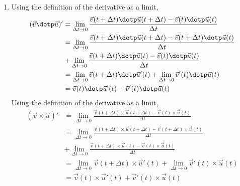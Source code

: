 \begin{enumerate}
    \item Using the definition of the derivative as a limit,
          \begin{align}
              (\vec{v} \dotp \vec{u})' & = \lim_{\Delta t \to 0}
              \frac{\vec{v}(t + \Delta t) \dotp \vec{u}(t + \Delta t) -
              \vec{v}(t) \dotp \vec{u}(t)}{\Delta t}             \\
                                       & = \lim_{\Delta t \to 0}
              \frac{\vec{v}(t + \Delta t) \dotp \vec{u}(t + \Delta t) -
              \vec{v}(t + \Delta t) \dotp \vec{u}(t)}{\Delta t}  \\
                                       & + \lim_{\Delta t \to 0}
              \frac{\vec{v}(t + \Delta t) \dotp \vec{u}(t) -
              \vec{v}(t) \dotp \vec{u}(t)}{\Delta t}             \\
                                       & = \lim_{\Delta t \to 0}
              \vec{v}(t + \Delta t) \dotp \vec{u}'(t) +
              \lim_{\Delta t \to 0} \vec{v}'(t) \dotp \vec{u}(t) \\
                                       & =
              \vec{v}(t) \dotp \vec{u}'(t) + \vec{v}'(t) \dotp \vec{u}(t)
          \end{align}
          Using the definition of the derivative as a limit,
          \begin{align}
              (\vec{v} \times \vec{u})' & = \lim_{\Delta t \to 0}
              \frac{\vec{v}(t + \Delta t) \times \vec{u}(t + \Delta t) -
              \vec{v}(t) \times \vec{u}(t)}{\Delta t}             \\
                                        & = \lim_{\Delta t \to 0}
              \frac{\vec{v}(t + \Delta t) \times \vec{u}(t + \Delta t) -
              \vec{v}(t + \Delta t) \times \vec{u}(t)}{\Delta t}  \\
                                        & + \lim_{\Delta t \to 0}
              \frac{\vec{v}(t + \Delta t) \times \vec{u}(t) -
              \vec{v}(t) \times \vec{u}(t)}{\Delta t}             \\
                                        & = \lim_{\Delta t \to 0}
              \vec{v}(t + \Delta t) \times \vec{u}'(t) +
              \lim_{\Delta t \to 0} \vec{v}'(t) \times \vec{u}(t) \\
                                        & =
              \vec{v}(t) \times \vec{u}'(t) + \vec{v}'(t) \times \vec{u}(t)
          \end{align}


\end{enumerate}
